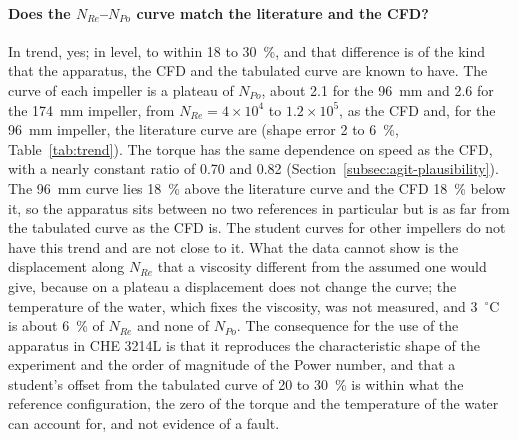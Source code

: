 \paragraph{Does the $N_{Re}$--$N_{Po}$ curve match the literature and the CFD?}
In trend, yes; in level, to within 18 to 30~\%, and that difference is of the kind that the apparatus, the CFD and the tabulated curve are known to have. The curve of each impeller is a plateau of $N_{Po}$, about 2.1 for the 96~mm and 2.6 for the 174~mm impeller, from $N_{Re} = 4\times10^{4}$ to $1.2\times10^{5}$, as the CFD and, for the 96~mm impeller, the literature curve are (shape error 2 to 6~\%, Table~\ref{tab:trend}). The torque has the same dependence on speed as the CFD, with a nearly constant ratio of 0.70 and 0.82 (Section~\ref{subsec:agit-plausibility}). The 96~mm curve lies 18~\% above the literature curve and the CFD 18~\% below it, so the apparatus sits between no two references in particular but is as far from the tabulated curve as the CFD is. The student curves for other impellers do not have this trend and are not close to it. What the data cannot show is the displacement along $N_{Re}$ that a viscosity different from the assumed one would give, because on a plateau a displacement does not change the curve; the temperature of the water, which fixes the viscosity, was not measured, and 3~$^{\circ}$C is about 6~\% of $N_{Re}$ and none of $N_{Po}$. The consequence for the use of the apparatus in CHE 3214L is that it reproduces the characteristic shape of the experiment and the order of magnitude of the Power number, and that a student's offset from the tabulated curve of 20 to 30~\% is within what the reference configuration, the zero of the torque and the temperature of the water can account for, and not evidence of a fault.

